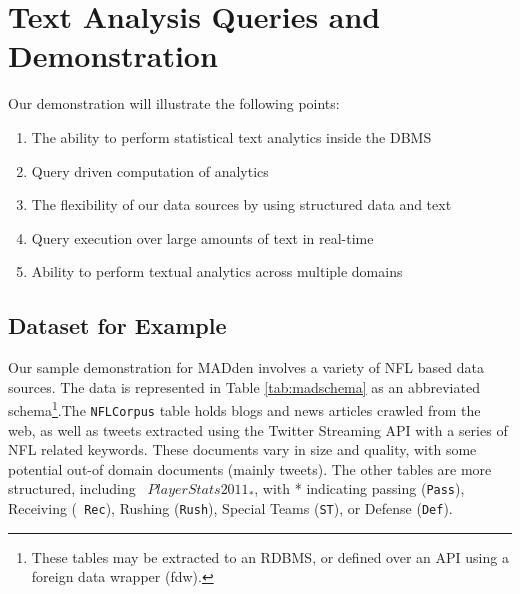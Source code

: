 \section{Text Analysis Queries and Demonstration}
Our demonstration will illustrate the following points: 
\begin{enumerate}
  \item The ability to perform statistical text analytics inside the DBMS
  \item Query driven computation of analytics
  \item The flexibility of our data sources by using structured data and text
  \item Query execution over large amounts of text in real-time
  \item Ability to perform textual analytics across multiple domains
\end{enumerate} 

\subsection{Dataset for Example}
Our sample demonstration for MADden involves a variety of NFL based data sources. 
The data is represented in Table \ref{tab:madschema} as an abbreviated
schema\footnote{These tables may be extracted to an RDBMS, or defined over an
API using a foreign data wrapper (fdw).}.The {\tt NFLCorpus} table holds blogs
and news articles crawled from the web, as well as tweets extracted using the
Twitter Streaming API with a series of NFL related keywords. These documents
vary in size and quality, with some potential out-of domain documents (mainly
tweets). The other tables are more structured, including {\tt
$PlayerStats2011_*$}, with * indicating passing ({\tt Pass}), Receiving ({\tt
Rec}), Rushing ({\tt Rush}), Special Teams ({\tt ST}), or Defense ({\tt Def}).





